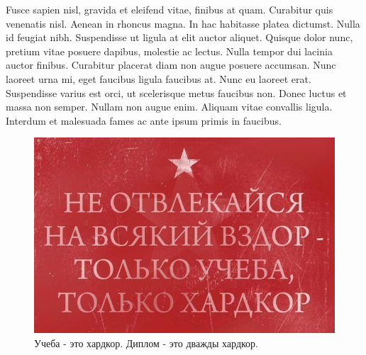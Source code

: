 Fusce sapien nisl, gravida et eleifend vitae, finibus at quam. Curabitur quis venenatis nisl.
Aenean in rhoncus magna. In hac habitasse platea dictumst. Nulla id feugiat nibh. Suspendisse ut
ligula at elit auctor aliquet. Quisque dolor nunc, pretium vitae posuere dapibus, molestie ac lectus.
Nulla tempor dui lacinia auctor finibus. Curabitur placerat diam non augue posuere accumsan. Nunc
laoreet urna mi, eget faucibus ligula faucibus at. Nunc eu laoreet erat. Suspendisse varius est orci,
ut scelerisque metus faucibus non. Donec luctus et massa non semper. Nullam non augue enim. Aliquam
vitae convallis ligula. Interdum et malesuada fames ac ante ipsum primis in faucibus.

\begin{figure}
  \includegraphics[width=\linewidth]{pics/hardcore.jpg}
  \caption{Учеба - это хардкор. Диплом - это дважды хардкор.}
\end{figure}
